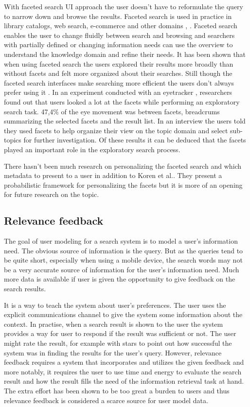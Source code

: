 \documentclass{sigchi}
\begin{document}
With faceted search UI approach the user doesn't have to reformulate the query to narrow down and browse the results. Faceted search is used in practice in library catalogs, web search, e-commerce and other domains \cite{kules09}, \cite{koren08}. Faceted search enables the user to change fluidly between search and browsing and searchers with partially defined or changing information needs can use the overview to understand the knowledge domain and refine their needs. It has been shown that when using faceted search the users explored their results more broadly than without facets and felt more organized about their searches. Still though the faceted search interfaces make searching more efficient the users don't always prefer using it \cite{kules09}. In an experiment conducted with an eyetracker \cite{kules09}, researchers found out that users looked a lot at the facets while performing an exploratory search task. 47,4\% of the eye movement was between facets, breadcrums summarizing the selected facets and the result list. In an interview the users told they used facets to help organize their view on the topic domain and select sub-topics for further investigation. Of these results it can be deduced that the facets played an important role in the exploratory search process. 

There hasn't been much research on personalizing the faceted search and which metadata to present to a user in addition to Koren et al.\cite{koren08}. They present a probabilistic framework for personalizing the facets but it is more of an opening for future research on the topic.

\subsection{Relevance feedback}
The goal of user modeling for a search system is to model a user's information need.
The obvious source of information is the query.
But as the queries tend to be quite short, especially when using a mobile device, the search words may not be a very accurate source of information for the user's information need.
Much more data is available if user is given the opportunity to give feedback on the search results.

It is a way to teach the system about user's preferences.
The user uses the explicit communications channel to give the system some information about the context.
In practise, when a search result is shown to the user the system provides a way for user to respond if the result was sufficient or not.
The user might rate the result, for example with stars to point out how successful the system was in finding the results for the user's query.
However, relevance feedback requires a system that incorporates and utilizes the given feedback and more notably, it requires the user to use time and energy to evaluate the search result and how the result fills the need of the information retrieval task at hand.
The extra effort has been shown to be too great a burden to users and thus relevance feedback is considered a scarce source for user model data.
\end{document}
